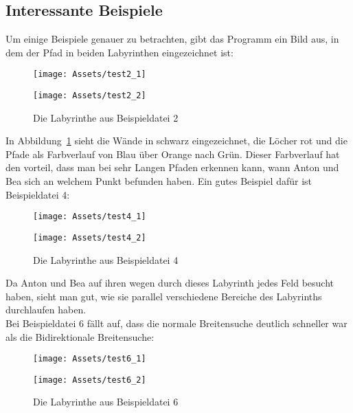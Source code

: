 \documentclass[a4paper,10pt,ngerman]{scrartcl}
\begin{document}
    \subsection{Interessante Beispiele}
    Um einige Beispiele genauer zu betrachten, gibt das Programm ein Bild aus, in dem der Pfad in beiden Labyrinthen eingezeichnet ist:
    \begin{figure} [H]
        \label{fig:2}
        \centering
        \begin{minipage}{.5\textwidth}
            \centering
            \texttt{[image: Assets/test2\_1]}
        \end{minipage}%
        \begin{minipage}{.5\textwidth}
            \centering
            \texttt{[image: Assets/test2\_2]}
        \end{minipage}
        \caption{Die Labyrinthe aus Beispieldatei 2}
    \end{figure}
    In Abbildung~\ref{fig:2} sieht die Wände in schwarz eingezeichnet, die Löcher rot und die Pfade als Farbverlauf von Blau über Orange nach Grün.
    Dieser Farbverlauf hat den vorteil, dass man bei sehr Langen Pfaden erkennen kann, wann Anton und Bea sich an welchem Punkt befunden haben.
    Ein gutes Beispiel dafür ist Beispieldatei 4:
    \begin{figure} [H]
        \label{fig:4}
        \centering
        \begin{minipage}{.5\textwidth}
            \centering
            \texttt{[image: Assets/test4\_1]}
        \end{minipage}%
        \begin{minipage}{.5\textwidth}
            \centering
            \texttt{[image: Assets/test4\_2]}
        \end{minipage}
        \caption{Die Labyrinthe aus Beispieldatei 4}
    \end{figure}
    Da Anton und Bea auf ihren wegen durch dieses Labyrinth jedes Feld besucht haben, sieht man gut, wie sie parallel verschiedene Bereiche des Labyrinths durchlaufen haben. \\
    Bei Beispieldatei 6 fällt auf, dass die normale Breitensuche deutlich schneller war als die Bidirektionale Breitensuche:
    \begin{figure} [H]
        \label{fig:6}
        \centering
        \begin{minipage}{.5\textwidth}
            \centering
            \texttt{[image: Assets/test6\_1]}
        \end{minipage}%
        \begin{minipage}{.5\textwidth}
            \centering
            \texttt{[image: Assets/test6\_2]}
        \end{minipage}
        \caption{Die Labyrinthe aus Beispieldatei 6}
    \end{figure}
\end{document}
